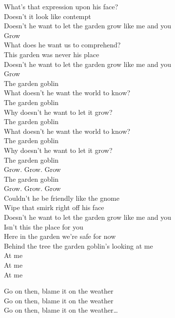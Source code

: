 What's that expression upon his face?\\
Doesn't it look like contempt\\
Doesn't he want to let the garden grow like me and you\\

Grow\\

What does he want us to comprehend?\\
This garden was never his place\\
Doesn't he want to let the garden grow like me and you\\

Grow\\

The garden goblin\\
What doesn't he want the world to know?\\
The garden goblin\\
Why doesn't he want to let it grow?\\
The garden goblin\\
What doesn't he want the world to know?\\
The garden goblin\\
Why doesn't he want to let it grow?\\
The garden goblin\\
Grow. Grow. Grow\\
The garden goblin\\
Grow. Grow. Grow\\

Couldn't he be friendly like the gnome\\
Wipe that smirk right off his face\\
Doesn't he want to let the garden grow like me and you\\

Isn't this the place for you\\
Here in the garden we're safe for now\\
Behind the tree the garden goblin's looking at me\\
At me\\
At me\\
At me\\




Go on then, blame it on the weather\\
Go on then, blame it on the weather\\
Go on then, blame it on the weather…\\

